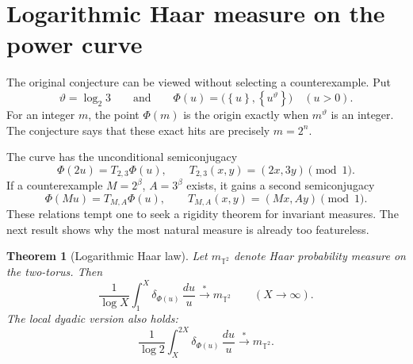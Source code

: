 \documentclass[11pt,oneside]{article}
\newtheorem{theorem}{Theorem}[section]
\theoremstyle{definition}
\theoremstyle{remark}
\newcommand{\Torus}{\mathbb T}
\newcommand{\thetaq}{\vartheta}
\newcommand{\fract}[1]{\left\{#1\right\}}
\begin{document}
\section{Logarithmic Haar measure on the power curve}
\label{mt:sec-log-haar}

The original conjecture can be viewed without selecting a counterexample.  Put
\begin{equation}
 \thetaq=\log_2 3
 \qquad\text{and}\qquad
 \Phi(u)=\bigl(\fract u,\fract{u^{\thetaq}}\bigr)
 \quad(u>0).
 \label{mt:eq-power-curve}
\end{equation}
For an integer $m$, the point $\Phi(m)$ is the origin exactly when $m^{\thetaq}$ is an integer.
The conjecture says that these exact hits are precisely $m=2^n$.

The curve has the unconditional semiconjugacy
\begin{equation}
 \Phi(2u)=T_{2,3}\Phi(u),
 \qquad
 T_{2,3}(x,y)=(2x,3y)\pmod1.
 \label{mt:eq-dyadic-semiconjugacy}
\end{equation}
If a counterexample $M=2^\beta$, $A=3^\beta$ exists, it gains a second semiconjugacy
\begin{equation}
 \Phi(Mu)=T_{M,A}\Phi(u),
 \qquad
 T_{M,A}(x,y)=(Mx,Ay)\pmod1.
 \label{mt:eq-counter-semiconjugacy}
\end{equation}
These relations tempt one to seek a rigidity theorem for invariant measures.  The next result
shows why the most natural measure is already too featureless.

\begin{theorem}[Logarithmic Haar law]
\label{mt:thm-log-haar}
Let $m_{\Torus^2}$ denote Haar probability measure on the two-torus.  Then
\begin{equation}
 \frac1{\log X}\int_1^X\delta_{\Phi(u)}\,\frac{du}{u}
 \stackrel{*}{\longrightarrow}m_{\Torus^2}
 \qquad(X\to\infty).
 \label{mt:eq-cumulative-log-haar}
\end{equation}
The local dyadic version also holds:
\begin{equation}
 \frac1{\log2}\int_X^{2X}\delta_{\Phi(u)}\,\frac{du}{u}
 \stackrel{*}{\longrightarrow}m_{\Torus^2}.
 \label{mt:eq-dyadic-log-haar}
\end{equation}
\end{theorem}
\end{document}

